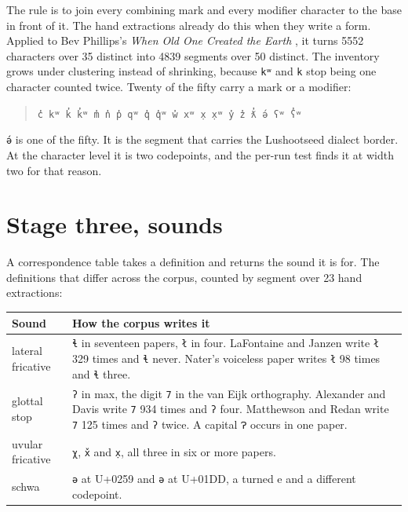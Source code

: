 The rule is to join every combining mark and every modifier character to the base in front of it. The
hand extractions already do this when they write a form. Applied to Bev Phillips's
\emph{When Old One Created the Earth} \cite{src:Hall-and-Phillips-2025}, it turns 5552 characters over 35 distinct into 4839 segments
over 50 distinct. The inventory grows under clustering instead of shrinking, because \texttt{kʷ} and
\texttt{k} stop being one character counted twice. Twenty of the fifty carry a mark or a modifier:

\begin{quote}
\texttt{c̓ kʷ k̓ k̓ʷ m̓ n̓ p̓ qʷ q̓ q̓ʷ w̓ xʷ x̣ x̣ʷ y̓ z̓ ƛ̓ ə́ ʕʷ ʕ̓ʷ}
\end{quote}

\texttt{ə́} is one of the fifty. It is the segment that carries the Lushootseed dialect border. At
the character level it is two codepoints, and the per-run test finds it at width two for that
reason.

\section{Stage three, sounds}

A correspondence table takes a definition and returns the sound it is for. The definitions that
differ across the corpus, counted by segment over 23 hand extractions:

\tiny
\setlength{\tabcolsep}{2pt}
\begin{longtable}{@{}>{\arraybackslash}p{}>{\arraybackslash}p{}@{}}
\toprule
Sound & How the corpus writes it \\
\midrule
lateral fricative & \texttt{ɬ} in seventeen papers, \texttt{ł} in four. LaFontaine and Janzen \cite{src:LaFontaine-and-Janzen-2024} write \texttt{ł} 329 times and \texttt{ɬ} never. Nater's voiceless paper writes \texttt{ł} 98 times and \texttt{ɬ} three. \\
glottal stop & \texttt{ʔ} in max, the digit \texttt{7} in the van Eijk orthography. Alexander and Davis \cite{src:Alexander-and-Davis-2026} write \texttt{7} 934 times and \texttt{ʔ} four. Matthewson and Redan \cite{src:Matthewson-and-Redan-2026} write \texttt{7} 125 times and \texttt{ʔ} twice. A capital \texttt{Ɂ} occurs in one paper. \\
uvular fricative & \texttt{χ}, \texttt{x̌} and \texttt{x̣}, all three in six or more papers. \\
schwa & \texttt{ə} at U+0259 and \texttt{ǝ} at U+01DD, a turned e and a different codepoint. \\
\bottomrule
\end{longtable}
\normalsize

